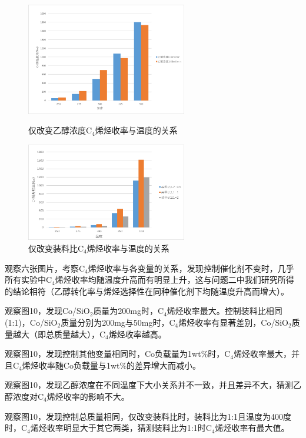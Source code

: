 \documentclass[a4paper,10.5pt]{ctexart}
\begin{document}
\begin{figure}[h]
\centering
\begin{minipage}[t]{0.48\textwidth}
\centering
\includegraphics[width=7cm]{乙醇三百度1wt200400.png}
\caption{仅改变乙醇浓度C$_4$烯烃收率与温度的关系}
\end{minipage}
\begin{minipage}[t]{0.48\textwidth}
\centering
\includegraphics[width=7cm]{装料比总质量100mg.png}
\caption{仅改变装料比C$_4$烯烃收率与温度的关系}
\end{minipage}
\end{figure}
\vspace*{150pt}



观察六张图片，考察C$_4$烯烃收率与各变量的关系，发现控制催化剂不变时，几乎所有实验中C$_4$烯烃收率均随温度升高而有明显上升，这与问题二中我们研究所得的结论相符（乙醇转化率与烯烃选择性在同种催化剂下均随温度升高而增大）。

观察图10，发现Co/SiO$_2$质量为200mg时，C$_4$烯烃收率最大。控制装料比相同(1:1)，Co/SiO$_2$质量分别为200mg与50mg时，C$_4$烯烃收率有显著差别，Co/SiO$_2$质量越大（即总质量越大），C$_4$烯烃收率越高。

观察图10，发现控制其他变量相同时，Co负载量为1wt\%时，C$_4$烯烃收率最大，并且C$_4$烯烃收率随Co负载量与1wt\%的差异增大而减小。

观察图10，发现乙醇浓度在不同温度下大小关系并不一致，并且差异不大，猜测乙醇浓度对C$_4$烯烃收率的影响不大。

观察图10，发现控制总质量相同，仅改变装料比时，装料比为1:1且温度为400度时，C$_4$烯烃收率明显大于其它两类，猜测装料比为1:1时C$_4$烯烃收率有最大值。
\end{document}
